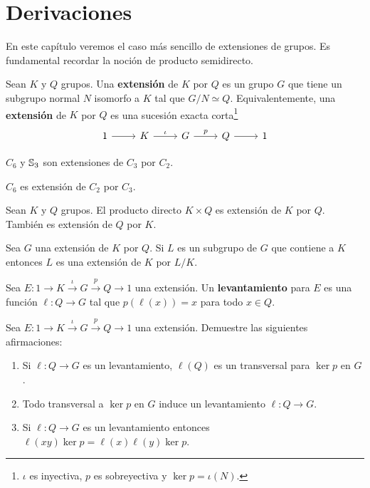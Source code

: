 \chapter{Derivaciones}
\label{derivaciones}

En este capítulo veremos el caso más sencillo de extensiones de grupos. Es fundamental 
recordar la noción de producto semidirecto. 

\begin{definition}
	Sean $K$ y $Q$ grupos. Una \textbf{extensión} de $K$ por $Q$ es un grupo
	$G$ que tiene un subgrupo normal $N$ isomorfo a $K$ tal que $G/N\simeq Q$.
	Equivalentemente, una \textbf{extensión} de $K$ por $Q$ es una sucesión
	exacta corta\footnote{$\iota$ es inyectiva, $p$ es sobreyectiva y $\ker
	p=\iota(N)$.}
\[
\begin{tikzcd}
	1 & K & G & Q & 1
	\arrow[from=1-1, to=1-2]
	\arrow["\iota", from=1-2, to=1-3]
	\arrow["p", from=1-3, to=1-4]
	\arrow[from=1-4, to=1-5]
\end{tikzcd}
\]
\end{definition}

\begin{example}
	$C_6$ y $\mathbb{S}_3$ son extensiones de $C_3$ por $C_2$.
\end{example}

\begin{example}
	$C_6$ es extensión de $C_2$ por $C_3$.
\end{example}

\begin{example}
	Sean $K$ y $Q$ grupos. El producto directo $K\times Q$ es extensión de $K$
	por $Q$. También es extensión de $Q$ por $K$.
\end{example}

Sea $G$ una extensión de $K$ por $Q$. Si $L$ es un subgrupo de $G$ que
contiene a $K$ entonces $L$ es una extensión de $K$ por $L/K$. 

\begin{definition}
	Sea $E\colon 1\to K\xrightarrow{\iota}G\xrightarrow{p} Q\to1$ una
	extensión.  Un \textbf{levantamiento} para $E$ es una función $\ell\colon
	Q\to G$ tal que $p(\ell(x))=x$ para todo $x\in Q$. 
\end{definition}

\begin{exercise}
	\label{xca:lifting}
	Sea $E\colon 1\to K\xrightarrow{\iota}G\xrightarrow{p} Q\to1$ una
	extensión.  Demuestre las siguientes afirmaciones:
	\begin{enumerate}
		\item Si $\ell\colon Q\to G$ es un levantamiento, $\ell(Q)$
			es un transversal para $\ker p$ en $G$.
		\item Todo transversal a $\ker p$ en $G$ induce un levantamiento $\ell\colon
			Q\to G$.
		\item Si $\ell\colon Q\to G$ es un levantamiento entonces
			$\ell(xy)\ker p=\ell(x)\ell(y)\ker p$.
	\end{enumerate}
\end{exercise}



